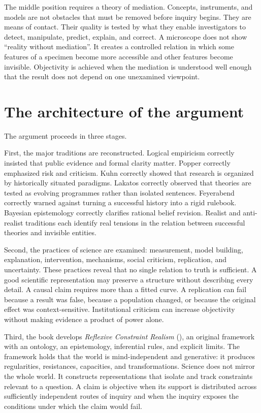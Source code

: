 The middle position requires a theory of mediation. Concepts, instruments, and
models are not obstacles that must be removed before inquiry begins. They are
means of contact. Their quality is tested by what they enable investigators to
detect, manipulate, predict, explain, and correct. A microscope does not show
\enquote{reality without mediation}. It creates a controlled relation in which
some features of a specimen become more accessible and other features become
invisible. Objectivity is achieved when the mediation is understood well enough
that the result does not depend on one unexamined viewpoint.

\section{The architecture of the argument}

The argument proceeds in three stages.

First, the major traditions are reconstructed. Logical empiricism correctly
insisted that public evidence and formal clarity matter. Popper correctly
emphasized risk and criticism. Kuhn correctly showed that research is organized
by historically situated paradigms. Lakatos correctly observed that theories are
tested as evolving programmes rather than isolated sentences. Feyerabend
correctly warned against turning a successful history into a rigid rulebook.
Bayesian epistemology correctly clarifies rational belief revision. Realist and
anti-realist traditions each identify real tensions in the relation between
successful theories and invisible entities.

Second, the practices of science are examined: measurement, model building,
explanation, intervention, mechanisms, social criticism, replication, and
uncertainty. These practices reveal that no single relation to truth is
sufficient. A good scientific representation may preserve a structure without
describing every detail. A causal claim requires more than a fitted curve. A
replication can fail because a result was false, because a population changed,
or because the original effect was context-sensitive. Institutional criticism
can increase objectivity without making evidence a product of power alone.

Third, the book develops \emph{Reflexive Constraint Realism} (\RCR), an original
framework with an ontology, an epistemology, inferential rules, and explicit
limits. The framework holds that the world is mind-independent and generative:
it produces regularities, resistances, capacities, and transformations. Science
does not mirror the whole world. It constructs representations that isolate
and track constraints relevant to a question. A claim is objective when its
support is distributed across sufficiently independent routes of inquiry and
when the inquiry exposes the conditions under which the claim would fail.

